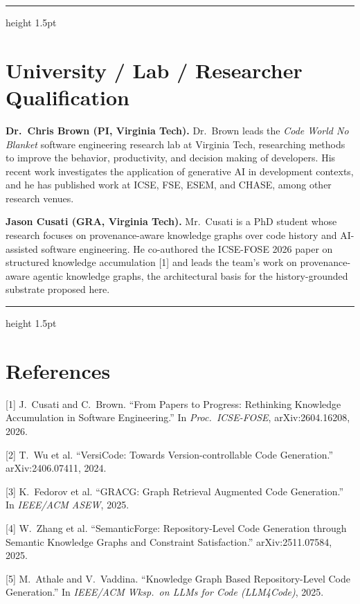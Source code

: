 \documentclass[11pt, letterpaper]{article}
\newcommand{\ehr}{{\color{gray!60}\hrule height 1.5pt}}
\begin{document}
\ehr

\section*{University / Lab / Researcher Qualification}
\label{sec:qualification}

\textbf{Dr.~Chris Brown (PI, Virginia Tech).} Dr.~Brown leads the \emph{Code World No Blanket} software engineering research lab at Virginia Tech, researching methods to improve the behavior, productivity, and decision making of developers. His recent work investigates the application of generative AI in development contexts, and he has published work at ICSE, FSE, ESEM, and CHASE, among other research venues.

\textbf{Jason Cusati (GRA, Virginia Tech).} Mr.~Cusati is a PhD student whose research focuses on provenance-aware knowledge graphs over code history and AI-assisted software engineering. He co-authored the ICSE-FOSE 2026 paper on structured knowledge accumulation [1] and leads the team's work on provenance-aware agentic knowledge graphs, the architectural basis for the history-grounded substrate proposed here.

\ehr

\section*{References}
\label{sec:references}

\small
[1] J.~Cusati and C.~Brown. ``From Papers to Progress: Rethinking Knowledge Accumulation in Software Engineering.'' In \textit{Proc.\ ICSE-FOSE}, arXiv:2604.16208, 2026. 

[2] T.~Wu et al. ``VersiCode: Towards Version-controllable Code Generation.'' arXiv:2406.07411, 2024.

[3] K.~Fedorov et al. ``GRACG: Graph Retrieval Augmented Code Generation.'' In \textit{IEEE/ACM ASEW}, 2025.

[4] W.~Zhang et al. ``SemanticForge: Repository-Level Code Generation through Semantic Knowledge Graphs and Constraint Satisfaction.'' arXiv:2511.07584, 2025.

[5] M.~Athale and V.~Vaddina. ``Knowledge Graph Based Repository-Level Code Generation.'' In \textit{IEEE/ACM Wksp.\ on LLMs for Code (LLM4Code)}, 2025.
\end{document}
